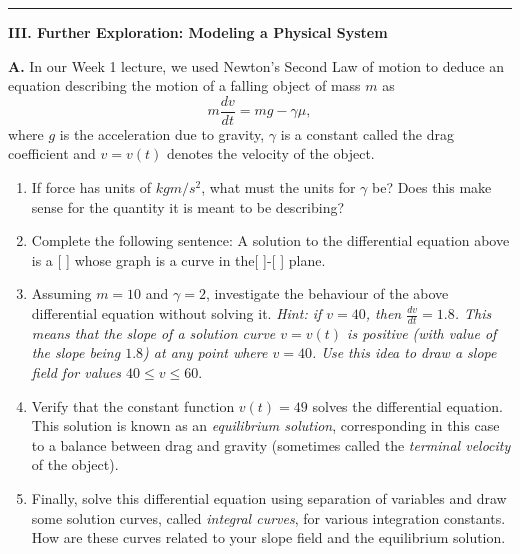 \documentclass[11pt,a4paper,twoside]{article}
\begin{document}
	\rule{\textwidth}{0.4pt}
	\textbf{III. Further Exploration: Modeling a Physical System}\par
	\textbf{A.} In our Week 1 lecture, we used Newton’s Second Law of motion to deduce an equation describing the motion of a falling object of mass $m$ as
	$$
	m\frac{dv}{dt} = mg - \gamma\mu,
	$$
	where $g$ is the acceleration due to gravity, $\gamma$ is a constant called the drag coefficient and $v = v(t)$ denotes the velocity of the object.
	\begin{enumerate}[\bfseries 1)]
		\item If force has units of $kg m/s^2$, what must the units for $\gamma$  be? Does this make sense for the quantity it is meant to be describing?
		\item Complete the following sentence: A solution to the differential equation above is a [ ] whose graph is a curve in the[ ]-[ ] plane.
		\item Assuming $m = 10$ and $\gamma = 2$, investigate the behaviour of the above differential equation without solving it. \textit{Hint: if $v = 40$, then $\frac{dv}{dt} = 1.8$. This means that the slope of a solution curve $v = v(t)$ is positive (with value of the slope being $1.8$) at any point where $v = 40$. Use this idea to draw a slope field for values $40 \le v \le 60$}.
		\item Verify that the constant function $v(t) = 49$ solves the differential equation. This solution is known as an \textit{equilibrium solution}, corresponding in this case to a balance between drag and gravity (sometimes called the \textit{terminal velocity} of the object).
		\item Finally, solve this differential equation using separation of variables and draw some solution curves, called \textit{integral curves}, for various integration constants. How are these curves related to your slope field and the equilibrium solution.
	\end{enumerate}
\end{document}
